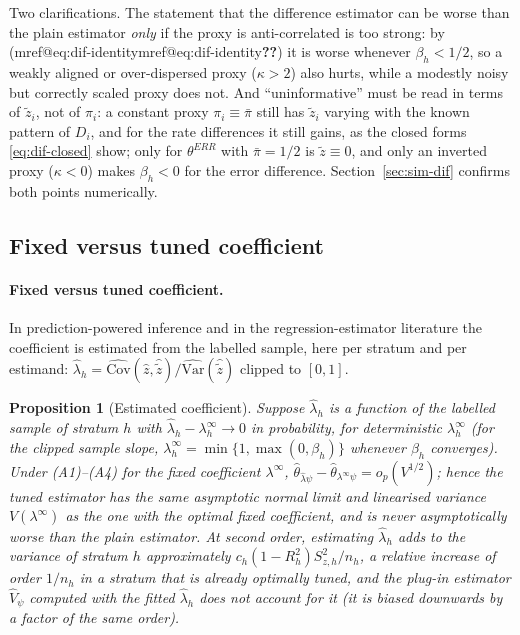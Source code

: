 \documentclass[pdflatex,sn-mathphys-num,iicol]{sn-jnl}
\makeatletter
\theoremstyle{thmstyleone}
\newtheorem{proposition}{Proposition}
\theoremstyle{thmstyletwo}
\theoremstyle{thmstylethree}
\newcommand{\Mref}[1]{\ifcsname mref@#1\endcsname\csname mref@#1\endcsname\else\textbf{??}\fi}
\makeatother
\begin{document}
Two clarifications. The statement that the difference estimator can be worse than the plain estimator \emph{only} if the proxy is anti-correlated is
too strong: by (\Mref{eq:dif-identity}) it is worse whenever $\beta_h<1/2$, so a weakly aligned or over-dispersed
proxy ($\kappa>2$) also hurts, while a modestly noisy but correctly scaled proxy does not. And ``uninformative'' must be read in terms of $\tilde z_i$,
not of $\pi_i$: a constant proxy $\pi_i\equiv\bar\pi$ still has $\tilde z_i$ varying with the known pattern of $D_i$, and for the rate differences
it still gains, as the closed forms \eqref{eq:dif-closed} show; only for $\theta^{ERR}$ with $\bar\pi=1/2$ is $\tilde z\equiv0$, and
only an inverted proxy ($\kappa<0$) makes $\beta_h<0$ for the error difference. Section~\ref{sec:sim-dif} confirms both points numerically.

\subsection{Fixed versus tuned coefficient}\label{si:theory-lambda}

\paragraph{Fixed versus tuned coefficient.} In prediction-powered inference \citep{angelopoulos2026ppipp,fisch2024stratppi} and in the
regression-estimator literature \citep{cassel1976,sarndal1992} the coefficient is estimated from the labelled sample, here
per stratum and per estimand: $\hat\lambda_h=\widehat{\mathrm{Cov}}(\hat z,\hat{\tilde z})/\widehat{\mathrm{Var}}(\hat{\tilde z})$ clipped to $[0,1]$.

\begin{proposition}[Estimated coefficient]\label{prop:dif-lambda}
Suppose $\hat\lambda_h$ is a function of the labelled sample of stratum $h$ with $\hat\lambda_h-\lambda^\infty_h\to0$ in probability, for deterministic
$\lambda^\infty_h$ (for the clipped sample slope, $\lambda^\infty_h=\min\{1,\max(0,\beta_h)\}$ whenever $\beta_h$ converges). Under (A1)--(A4)
for the fixed coefficient $\lambda^\infty$, $\hat\theta_{\hat\lambda\psi}-\hat\theta_{\lambda^\infty\psi}=o_p(V^{1/2})$; hence the tuned estimator has the same asymptotic
normal limit and linearised variance $V(\lambda^\infty)$ as the one with the optimal fixed coefficient, and is never asymptotically worse than the plain
estimator. At second order, estimating $\hat\lambda_h$ adds to the variance of stratum $h$ approximately
$c_h(1-R_h^2)S^2_{z,h}/n_h$, a relative increase of order $1/n_h$ in a stratum that is already optimally tuned, and the plug-in estimator $\hat V_\psi$ computed
with the fitted $\hat\lambda_h$ does not account for it (it is biased downwards by a factor of the same order).
\end{proposition}
\end{document}

